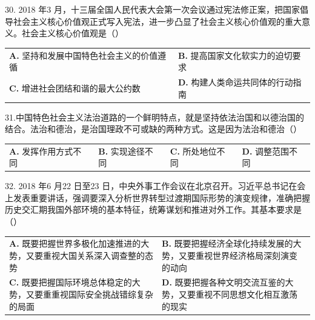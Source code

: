 \documentclass[UTF8,11pt]{ctexart}
\begin{document}
30. 2018 年3 月，十三届全国人民代表大会第一次会议通过宪法修正案，把国家倡导社会主义核心价值观正式写入宪法，进一步凸显了社会主义核心价值观的重大意义。社会主义核心价值观是（）


\begin{center}\begin{tabular}{>{\raggedright\arraybackslash}p{\dimexpr(\linewidth-4\tabcolsep)/2\relax}>{\raggedright\arraybackslash}p{\dimexpr(\linewidth-4\tabcolsep)/2\relax}}
\textbf{A.} 坚持和发展中国特色社会主义的价值遵循 & \textbf{B.} 提高国家文化软实力的迫切要求\\[.35em]
\textbf{C.} 增进社会团结和谐的最大公约数 & \textbf{D.} 构建人类命运共同体的行动指南\\[.35em]\end{tabular}\end{center}

31.中国特色社会主义法治道路的一个鲜明特点，就是坚持依法治国和以德治国的结合。法治和德治，是治国理政不可或缺的两种方式。这是因为法治和德治（）


\begin{center}\begin{tabular}{>{\raggedright\arraybackslash}p{\dimexpr(\linewidth-8\tabcolsep)/4\relax}>{\raggedright\arraybackslash}p{\dimexpr(\linewidth-8\tabcolsep)/4\relax}>{\raggedright\arraybackslash}p{\dimexpr(\linewidth-8\tabcolsep)/4\relax}>{\raggedright\arraybackslash}p{\dimexpr(\linewidth-8\tabcolsep)/4\relax}}
\textbf{A.} 发挥作用方式不同 & \textbf{B.} 实现途径不同 & \textbf{C.} 所处地位不同 & \textbf{D.} 调整范围不同\\[.35em]\end{tabular}\end{center}

32. 2018 年6 月22 日至23 日，中央外事工作会议在北京召开。习近平总书记在会上发表重要讲话，强调要深入分析世界转型过渡期国际形势的演变规律，准确把握历史交汇期我国外部环境的基本特征，统筹谋划和推进对外工作。其基本要求是（）


\begin{center}\begin{tabular}{>{\raggedright\arraybackslash}p{\dimexpr(\linewidth-4\tabcolsep)/2\relax}>{\raggedright\arraybackslash}p{\dimexpr(\linewidth-4\tabcolsep)/2\relax}}
\textbf{A.} 既要把握世界多极化加速推进的大势，又要重视大国关系深入调查整的态势 & \textbf{B.} 既要把握经济全球化持续发展的大势，又要重视世界经济格局深刻演变的动向\\[.35em]
\textbf{C.} 既要把握国际环境总体稳定的大势，又要重重视国际安全挑战错综复杂的局面 & \textbf{D.} 既要把握各种文明交流互鉴的大势，又要重视不同思想文化相互激荡的现实\\[.35em]\end{tabular}\end{center}
\end{document}
